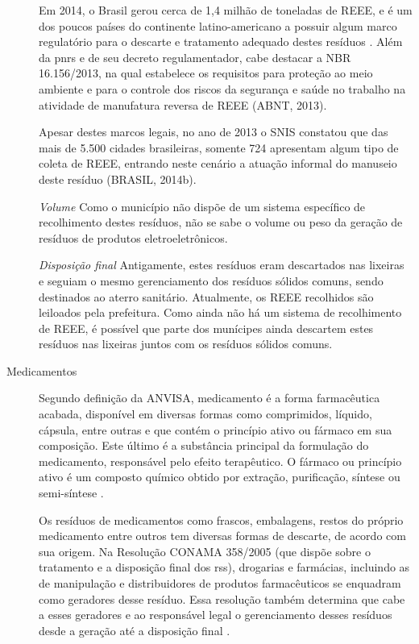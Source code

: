 \begin{description}
	Em 2014, o Brasil gerou cerca de 1,4 milhão de toneladas de REEE, e é um dos poucos países do continente latino-americano a possuir algum marco regulatório para o descarte e tratamento adequado destes resíduos \cite{WHO2015}. Além da \gls{pnrs} e de seu decreto regulamentador, cabe destacar a NBR 16.156/2013, na qual estabelece os requisitos para proteção ao meio ambiente e para o controle dos riscos da segurança e saúde no trabalho na atividade de manufatura reversa de REEE (ABNT, 2013). 
	
	Apesar destes marcos legais, no ano de 2013 o SNIS constatou que das mais de 5.500 cidades brasileiras, somente 724 apresentam algum tipo de coleta de REEE, entrando neste cenário a atuação informal do manuseio deste resíduo (BRASIL, 2014b).
	
		\subitem \textit{Volume}
		Como o município não dispõe de um sistema específico de recolhimento destes resíduos, não se sabe o volume ou peso da geração de resíduos de produtos eletroeletrônicos.
	
		\subitem \textit{Disposição final}
		Antigamente, estes resíduos eram descartados nas lixeiras e seguiam o mesmo gerenciamento dos resíduos sólidos comuns, sendo destinados ao aterro sanitário. Atualmente, os REEE recolhidos são leiloados pela prefeitura.
		Como ainda não há um sistema de recolhimento de REEE, é possível que parte dos munícipes ainda descartem estes resíduos nas lixeiras juntos com os resíduos sólidos comuns.
	
	\item[Medicamentos] Segundo definição da ANVISA, medicamento é a forma farmacêutica acabada, disponível em diversas formas como comprimidos, líquido, cápsula, entre outras e que contém o princípio ativo ou fármaco em sua composição. Este último é a substância principal da formulação do medicamento, responsável pelo efeito terapêutico. O fármaco ou princípio ativo é um composto químico obtido por extração, purificação, síntese ou semi-síntese \cite{anvisa2010}.
	
	Os resíduos de medicamentos como frascos, embalagens, restos do próprio medicamento entre outros tem diversas formas de descarte, de acordo com sua origem. Na Resolução CONAMA 358/2005 (que dispõe sobre o tratamento e a disposição final dos \gls{rss}), drogarias e farmácias, incluindo as de manipulação e distribuidores de produtos farmacêuticos se enquadram como geradores desse resíduo. Essa resolução também determina que cabe a esses geradores e ao responsável legal o gerenciamento desses resíduos desde a geração até a disposição final \cite{conama:358}.
	

\end{description}
